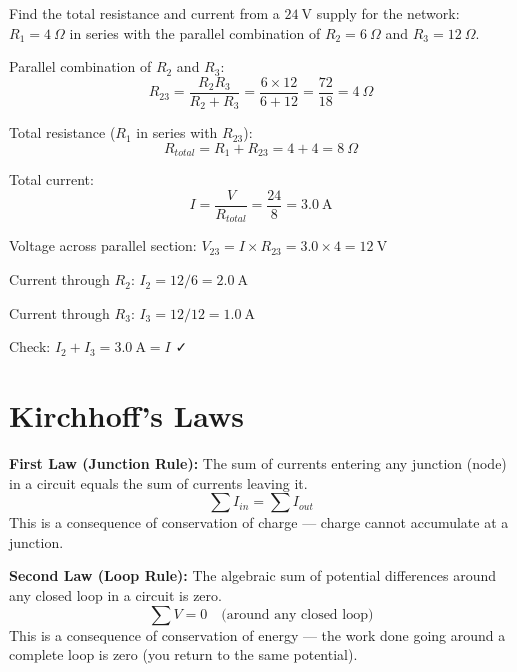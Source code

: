 \begin{examplebox}[23.3]
Find the total resistance and current from a
$24\ \text{V}$ supply for the network: $R_1 = 4\ \Omega$
in series with the parallel combination of
$R_2 = 6\ \Omega$ and $R_3 = 12\ \Omega$.
\end{examplebox}

\begin{solutionbox}
Parallel combination of $R_2$ and $R_3$:
\[
  R_{23} = \frac{R_2 R_3}{R_2 + R_3}
  = \frac{6 \times 12}{6 + 12}
  = \frac{72}{18} = 4\ \Omega
\]

Total resistance ($R_1$ in series with $R_{23}$):
\[
  R_{total} = R_1 + R_{23} = 4 + 4 = 8\ \Omega
\]

Total current:
\[
  I = \frac{V}{R_{total}} = \frac{24}{8}
  = 3.0\ \text{A}
\]

Voltage across parallel section:
$V_{23} = I \times R_{23} = 3.0 \times 4 = 12\ \text{V}$

Current through $R_2$: $I_2 = 12/6 = 2.0\ \text{A}$

Current through $R_3$: $I_3 = 12/12 = 1.0\ \text{A}$

Check: $I_2 + I_3 = 3.0\ \text{A} = I$ ✓
\end{solutionbox}

\section{Kirchhoff's Laws}

\begin{lawbox}
\textbf{First Law (Junction Rule):}
The sum of currents entering any junction (node)
in a circuit equals the sum of currents leaving it.
\[
  \sum I_{in} = \sum I_{out}
\]
This is a consequence of conservation of charge
--- charge cannot accumulate at a junction.
\end{lawbox}

\begin{lawbox}
\textbf{Second Law (Loop Rule):}
The algebraic sum of potential differences around
any closed loop in a circuit is zero.
\[
  \sum V = 0 \quad \text{(around any closed loop)}
\]
This is a consequence of conservation of energy
--- the work done going around a complete loop is
zero (you return to the same potential).
\end{lawbox}

